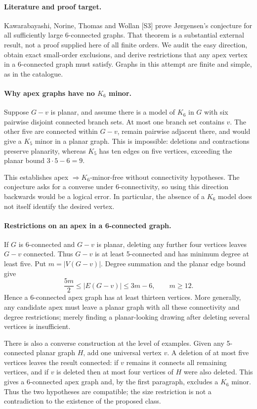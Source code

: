 \documentclass[11pt,a4paper]{article}
\begin{document}
\paragraph{Literature and proof target.}
Kawarabayashi, Norine, Thomas and Wollan [S3] prove J\o rgensen's conjecture for all sufficiently large 6-connected graphs. That theorem is a substantial external result, not a proof supplied here of all finite orders. We audit the easy direction, obtain exact small-order exclusions, and derive restrictions that any apex vertex in a 6-connected graph must satisfy. Graphs in this attempt are finite and simple, as in the catalogue.

\paragraph{Why apex graphs have no $K_6$ minor.}
Suppose $G-v$ is planar, and assume there is a model of $K_6$ in $G$ with six pairwise disjoint connected branch sets. At most one branch set contains $v$. The other five are connected within $G-v$, remain pairwise adjacent there, and would give a $K_5$ minor in a planar graph. This is impossible: deletions and contractions preserve planarity, whereas $K_5$ has ten edges on five vertices, exceeding the planar bound $3\cdot5-6=9$.

This establishes apex $\Rightarrow K_6$-minor-free without connectivity hypotheses. The conjecture asks for a converse under 6-connectivity, so using this direction backwards would be a logical error. In particular, the absence of a $K_6$ model does not itself identify the desired vertex.

\paragraph{Restrictions on an apex in a 6-connected graph.}
If $G$ is 6-connected and $G-v$ is planar, deleting any further four vertices leaves $G-v$ connected. Thus $G-v$ is at least 5-connected and has minimum degree at least five. Put $m=|V(G-v)|$. Degree summation and the planar edge bound give
\[
 \frac{5m}{2}\le |E(G-v)|\le3m-6,
 \qquad m\ge12. \tag{1}
\]
Hence a 6-connected apex graph has at least thirteen vertices. More generally, any candidate apex must leave a planar graph with all these connectivity and degree restrictions; merely finding a planar-looking drawing after deleting several vertices is insufficient.

There is also a converse construction at the level of examples. Given any 5-connected planar graph $H$, add one universal vertex $v$. A deletion of at most five vertices leaves the result connected: if $v$ remains it connects all remaining vertices, and if $v$ is deleted then at most four vertices of $H$ were also deleted. This gives a 6-connected apex graph and, by the first paragraph, excludes a $K_6$ minor. Thus the two hypotheses are compatible; the size restriction is not a contradiction to the existence of the proposed class.
\end{document}

